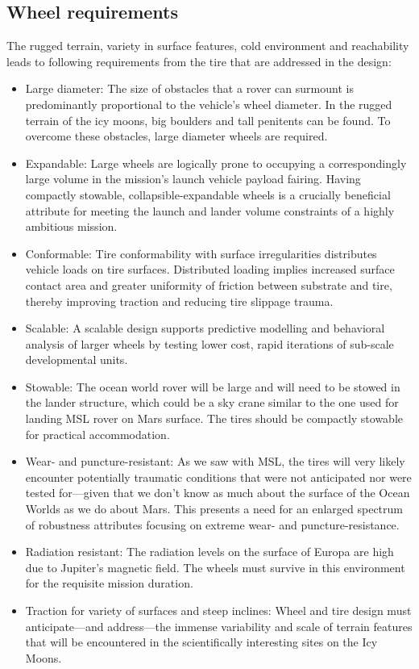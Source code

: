 \documentclass{article}
\begin{document}
\subsection{Wheel requirements}
The rugged terrain, variety in surface features, cold environment and reachability leads to following requirements from the tire that are addressed in the design:
\begin{itemize}
    \item Large diameter: The size of obstacles that a rover can surmount is predominantly proportional to the vehicle's wheel diameter. In the rugged terrain of the icy moons, big boulders and tall penitents can be found. To overcome these obstacles, large diameter wheels are required.
    \item Expandable: Large wheels are logically prone to occupying a correspondingly large volume in the mission’s launch vehicle payload fairing. Having compactly stowable, collapsible-expandable wheels is a crucially beneficial attribute for meeting the launch and lander volume constraints of a highly ambitious mission.
    \item Conformable: Tire conformability with surface irregularities distributes vehicle loads on tire surfaces. Distributed loading implies increased surface contact area and greater uniformity of friction between substrate and tire, thereby improving traction and reducing tire slippage trauma.     
    \item Scalable: A scalable design supports predictive modelling and behavioral analysis of larger wheels by testing lower cost, rapid iterations of sub-scale developmental units.
    \item Stowable: The ocean world rover will be large and will need to be stowed in the lander structure, which could be a sky crane similar to the one used for landing MSL rover on Mars surface. The tires should be compactly stowable for practical accommodation. 
    \item Wear- and puncture-resistant: As we saw with MSL, the tires will very likely encounter potentially traumatic conditions that were not anticipated nor were tested for—given that we don’t know as much about the surface of the Ocean Worlds as we do about Mars. This presents a need for an enlarged spectrum of robustness attributes focusing on extreme wear- and puncture-resistance.
    \item Radiation resistant: The radiation levels on the surface of Europa are high due to Jupiter’s magnetic field. The wheels must survive in this environment for the requisite mission duration. 
    \item Traction for variety of surfaces and steep inclines: Wheel and tire design must anticipate—and address—the immense variability and scale of terrain features that will be encountered in the scientifically interesting sites on the Icy Moons.  
    
\end{itemize}
\end{document}
